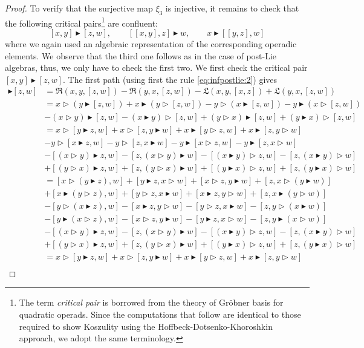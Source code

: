 \documentclass[10pt]{article}
\theoremstyle{definition}
\newcommand{\wt}{\vartriangleright}
\newcommand{\bt}{\blacktriangleright}
\newcommand{\R}{\mathfrak{R}}
\renewcommand{\L}{\mathfrak{L}}
\begin{document}
\begin{proof}
To verify that the surjective map $\xi_{3}$ is injective, it remains to check that the following critical pairs\footnote{The term \emph{critical pair} is borrowed from the theory of Gr\"obner basis for quadratic operads. Since the computations that follow are identical to those required to show Koszulity using the Hoffbeck-Dotsenko-Khoroshkin approach, we adopt the same terminology.} are confluent:
\[
[x,y]\bt[z,w],\qquad [[x,y],z]\bt w,\qquad x\bt[[y,z],w]
\]
where we again used an algebraic representation of the corresponding operadic elements.
We observe that the third one follows as in the case of post-Lie algebras, thus, we only have to check the first two. 
We first check the critical pair $[x,y]\bt[z,w]$. The first path (using first the rule \eqref{eq:infpostlie:2}) gives
\begingroup
\allowdisplaybreaks
\begin{align*}
[x,y] \bt [z,w] &= \R(x,y,[z,w]) - \R(y,x,[z,w]) - \L(x,y,[x,z]) + \L(y,x,[z,w]) \\
&= x \wt (y \bt [z,w]) + x \bt(y \wt [z,w]) - y \wt (x \bt [z,w]) - y \bt(x \wt [z,w]) \\
& - (x \wt y) \bt[z,w] - (x \bt y) \wt[z,w] + (y \wt x) \bt[z,w] + (y \bt x) \wt[z,w] \\
&= x \wt [y \bt z,w] + x \wt [z, y \bt w] + x \bt [y \wt z,w] + x \bt [z, y \wt w] \\
& - y \wt [x \bt z,w] - y \wt [z, x \bt w] - y \bt [x \wt z,w] - y \bt [z, x \wt w]\\
&- [(x \wt y)\bt z,w] -[z,(x \wt y)\bt w] - [(x \bt y)\wt z,w] -[z,(x \bt y)\wt w] \\
&+  [(y \wt x)\bt z,w] +[z,(y \wt x)\bt w] + [(y \bt x)\wt z,w] +[z,(y \bt x)\wt w]\\
&=[x \wt (y \bt z),w] + [y \bt z, x \wt w] + [x \wt z, y \bt w] + [z, x \wt (y \bt w)]\\
& + [x \bt (y \wt z),w] + [y \wt z, x \bt w] + [x \bt z, y \wt w] + [z, x \bt (y \wt w)]\\
& - [y \wt (x \bt z),w] - [x \bt z,y \wt w ] - [y \wt z , x \bt w] - [z, y \wt (x \bt w)]\\
&- [y \bt (x \wt z),w] - [x \wt z,y \bt w ] - [y \bt z , x \wt w] - [z, y \bt (x \wt w)]\\
&- [(x \wt y)\bt z,w] -[z,(x \wt y)\bt w] - [(x \bt y)\wt z,w] -[z,(x \bt y)\wt w] \\
&+  [(y \wt x)\bt z,w] +[z,(y \wt x)\bt w] + [(y \bt x)\wt z,w] +[z,(y \bt x)\wt w] \\
&= x \wt [y \bt z,w] + x \wt [z, y \bt w] + x \bt [y \wt z,w] + x \bt [z, y \wt w] \\

\end{align*}
\end{proof}
\end{document}
